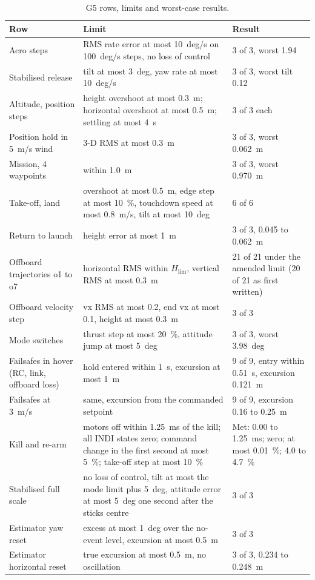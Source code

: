 \begin{table}[tbp]
\caption{G5 rows, limits and worst-case results.}\label{tab:val_g5}
\centering
\footnotesize
\begin{tabularx}{\textwidth}{@{}L{3.1cm} L{5.6cm} Y@{}}
\toprule
Row & Limit & Result \\
\midrule
Acro steps & RMS rate error at most 10~deg/s on 100~deg/s steps, no loss of control & 3 of 3, worst 1.94 \\
Stabilised release & tilt at most 3~deg, yaw rate at most 10~deg/s & 3 of 3, worst tilt 0.12 \\
Altitude, position steps & height overshoot at most 0.3~m; horizontal overshoot at most 0.5~m; settling at most 4~s & 3 of 3 each \\
Position hold in 5~m/s wind & 3-D RMS at most 0.3~m & 3 of 3, worst 0.062~m \\
Mission, 4 waypoints & within 1.0~m & 3 of 3, worst 0.970~m \\
Take-off, land & overshoot at most 0.5~m, edge step at most 10~\%, touchdown speed at most 0.8~m/s, tilt at most 10~deg & 6 of 6 \\
Return to launch & height error at most 1~m & 3 of 3, 0.045 to 0.062~m \\
Offboard trajectories o1 to o7 & horizontal RMS within $H_\mathrm{lim}$, vertical RMS at most 0.3~m & 21 of 21 under the amended limit (20 of 21 as first written) \\
Offboard velocity step & vx RMS at most 0.2, end vx at most 0.1, height at most 0.3~m & 3 of 3 \\
Mode switches & thrust step at most 20~\%, attitude jump at most 5~deg & 3 of 3, worst 3.98~deg \\
Failsafes in hover (RC, link, offboard loss) & hold entered within 1~s, excursion at most 1~m & 9 of 9, entry within 0.51~s, excursion 0.121~m \\
Failsafes at 3~m/s & same, excursion from the commanded setpoint & 9 of 9, excursion 0.16 to 0.25~m \\
Kill and re-arm & motors off within 1.25~ms of the kill; all INDI states zero; command change in the first second at most 5~\%; take-off step at most 10~\% & Met: 0.00 to 1.25~ms; zero; at most 0.01~\%; 4.0 to 4.7~\% \\
Stabilised full scale & no loss of control, tilt at most the mode limit plus 5~deg, attitude error at most 5~deg one second after the sticks centre & 3 of 3 \\
Estimator yaw reset & excess at most 1~deg over the no-event level, excursion at most 0.5~m & 3 of 3 \\
Estimator horizontal reset & true excursion at most 0.5~m, no oscillation & 3 of 3, 0.234 to 0.248~m \\
\bottomrule
\end{tabularx}
\end{table}

